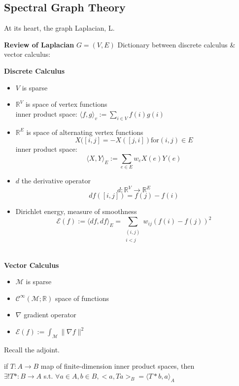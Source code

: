 {	\subsection{Spectral Graph Theory}
	At its heart, the graph Laplacian, L.
	
	\textbf{Review of Laplacian}
	$G = (V,E)$
	Dictionary between discrete calculus \& vector calculus:

	\begin{multicols}{2}
		\textbf{Discrete Calculus}\\
		\begin{itemize}
		\item $V$ is sparse  
		\item $\mathbb R^V$ is space of vertex functions\\
			 inner product space: $\langle f,g\rangle_v := \sum_{i\in V} f(i)g(i)$
		
		\item $\mathbb R^E$ is space of alternating vertex functions
			 \[X([i,j] = -X([j,i]) \textrm{for} (i,j) \in E \]
			inner product space: \[\langle X,Y\rangle_E := \sum_{e \in E} w_e X(e) Y(e) \]
		\item $d$ the derivative operator
		\[d: \mathbb R^V \rightarrow \mathbb R^E\]
		\[ df([i,j]) = f(j)-f(i)\]
		\item Dirichlet energy, measure of smoothness
		\[\mathcal E(f) := \langle df,df\rangle_E = \sum_{\substack{(i,j)\\
				{i < j}}} w_{ij} (f(i)-f(j))^2\]\\
		\end{itemize}
		\columnbreak
		\textbf{Vector Calculus}
		\begin{itemize}
			\item $\mathcal M$ is sparse
			\item $\mathcal C^{\infty}(\mathcal M; \mathbb R)$ space of functions 
			\item $\nabla$ gradient operator
			\item $\mathcal E(f) := \int_{\mathcal M} \lVert \nabla f \rVert ^2$
		\end{itemize}
	\end{multicols}
	Recall the adjoint.\\
	\begin{center}
		if $T: A \rightarrow B$ map of finite-dimension inner product spaces, then\\
		$\exists! T*: B \rightarrow A$ s.t. $\forall a \in A, b \in B, <a, Ta>_B = \langle T*b, a\rangle_A$
	\end{center}
	
}
